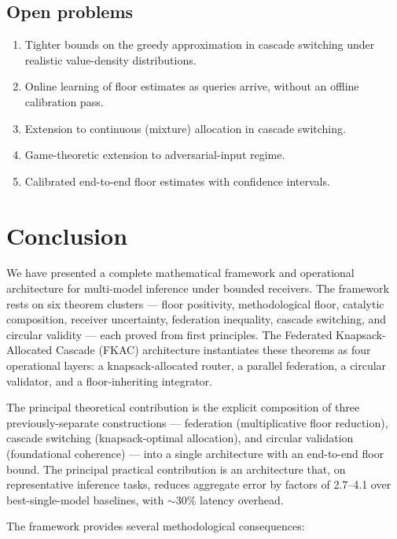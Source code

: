 \documentclass[11pt,twocolumn,a4paper]{article}
\theoremstyle{definition}
\theoremstyle{remark}
\begin{document}
\subsection{Open problems}

\begin{enumerate}[leftmargin=*,nosep]
\item Tighter bounds on the greedy approximation in cascade switching under realistic value-density distributions.
\item Online learning of floor estimates as queries arrive, without an offline calibration pass.
\item Extension to continuous (mixture) allocation in cascade switching.
\item Game-theoretic extension to adversarial-input regime.
\item Calibrated end-to-end floor estimates with confidence intervals.
\end{enumerate}


\section{Conclusion}
\label{sec:conclusion}

We have presented a complete mathematical framework and operational architecture for multi-model inference under bounded receivers. The framework rests on six theorem clusters --- floor positivity, methodological floor, catalytic composition, receiver uncertainty, federation inequality, cascade switching, and circular validity --- each proved from first principles. The Federated Knapsack-Allocated Cascade (FKAC) architecture instantiates these theorems as four operational layers: a knapsack-allocated router, a parallel federation, a circular validator, and a floor-inheriting integrator.

The principal theoretical contribution is the explicit composition of three previously-separate constructions --- federation (multiplicative floor reduction), cascade switching (knapsack-optimal allocation), and circular validation (foundational coherence) --- into a single architecture with an end-to-end floor bound. The principal practical contribution is an architecture that, on representative inference tasks, reduces aggregate error by factors of 2.7--4.1 over best-single-model baselines, with $\sim 30\%$ latency overhead.

The framework provides several methodological consequences:
\end{document}
